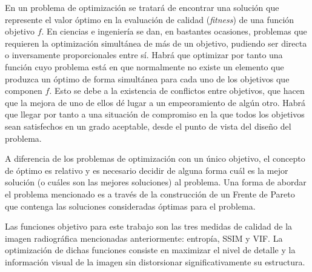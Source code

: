 \documentclass[sigplan,screen]{acmart}
\begin{document}
En un problema de optimización se tratará de encontrar una solución que represente el valor óptimo en la evaluación de calidad (\textit{fitness}) de una función objetivo $f$. En ciencias e ingeniería se dan, en bastantes ocasiones, problemas que requieren la optimización simultánea de más de un objetivo, pudiendo ser directa o inversamente proporcionales entre sí. Habrá que optimizar por tanto una función cuyo problema está en que normalmente no existe un elemento que produzca un óptimo de forma simultánea para cada uno de los objetivos que componen $f$. Esto se debe a la existencia de conflictos entre objetivos, que hacen que la mejora de uno de ellos dé lugar a un empeoramiento de algún otro. Habrá que llegar por tanto a una situación de compromiso en la que todos los objetivos sean satisfechos en un grado aceptable, desde el punto de vista del diseño del problema.\par
A diferencia de los problemas de optimización con un único objetivo, el concepto de óptimo es relativo y es necesario decidir de alguna forma cuál es la mejor solución (o cuáles son las mejores soluciones) al problema. Una forma de abordar el problema mencionado es a través de la construcción de un Frente de Pareto que contenga las soluciones consideradas óptimas para el problema.\par
Las funciones objetivo para este trabajo son las tres medidas de calidad de la imagen radiográfica mencionadas anteriormente: entropía, SSIM y VIF. La optimización de dichas funciones consiste en maximizar el nivel de detalle y la información visual de la imagen sin distorsionar significativamente su estructura.
\end{document}
